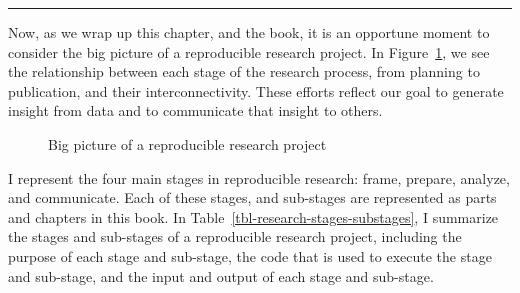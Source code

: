 \documentclass[
  letterpaper,
  krantz1]{latex/krantz-mod}
\theoremstyle{definition}
\theoremstyle{definition}
\theoremstyle{remark}
\begin{document}
\begin{center}\rule{0.5\linewidth}{0.5pt}\end{center}

Now, as we wrap up this chapter, and the book, it is an opportune moment
to consider the big picture of a reproducible research project. In
Figure~\ref{fig-big-picture}, we see the relationship between each stage
of the research process, from planning to publication, and their
interconnectivity. These efforts reflect our goal to generate insight
from data and to communicate that insight to
others.

\begin{figure}[!htb]


\caption{\label{fig-big-picture}Big picture of a reproducible research
project}

\end{figure}%

I represent the four main stages in reproducible research: frame,
prepare, analyze, and communicate. Each of these stages, and sub-stages
are represented as parts and chapters in this book. In
Table~\ref{tbl-research-stages-substages}, I summarize the stages and
sub-stages of a reproducible research project, including the purpose of
each stage and sub-stage, the code that is used to execute the stage and
sub-stage, and the input and output of each stage and sub-stage.

\pagebreak
\end{document}
